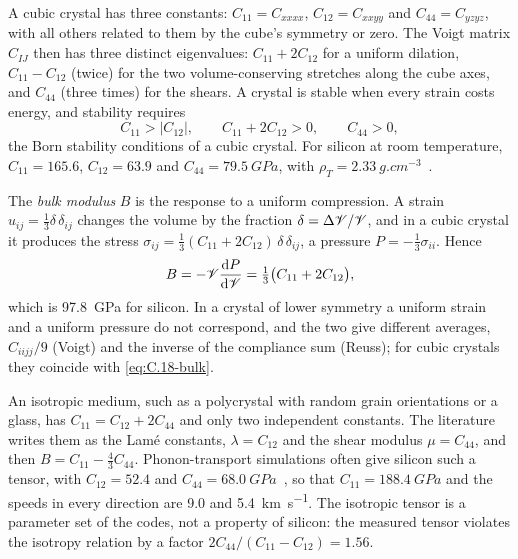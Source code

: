 A cubic crystal has three constants: $C_{11} = C_{xxxx}$, $C_{12} = C_{xxyy}$ and $C_{44} = C_{yzyz}$, with all others related to them by the cube's symmetry or zero. The Voigt matrix $C_{IJ}$ then has three distinct eigenvalues: $C_{11} + 2C_{12}$ for a uniform dilation, $C_{11} - C_{12}$ (twice) for the two volume-conserving stretches along the cube axes, and $C_{44}$ (three times) for the shears. A crystal is stable when every strain costs energy, and stability requires
\begin{equation}
  C_{11} > |C_{12}|, \qquad C_{11} + 2C_{12} > 0, \qquad C_{44} > 0 ,
  \label{eq:C.18-born}
\end{equation}
the Born stability conditions of a cubic crystal. For silicon at room temperature, $C_{11} = 165.6$, $C_{12} = 63.9$ and $C_{44} = \SI{79.5}{GPa}$, with $\rho_T = \SI{2.33}{g.cm^{-3}}$~\cite[Table~I]{martinez2019measurements}.

The \emph{bulk modulus} $B$ is the response to a uniform compression. A strain $u_{ij} = \tfrac13\delta\,\delta_{ij}$ changes the volume by the fraction $\delta = \Delta \mathscr{V}/\mathscr{V}$, and in a cubic crystal it produces the stress $\sigma_{ij} = \tfrac13(C_{11} + 2C_{12})\,\delta\,\delta_{ij}$, a pressure $P = -\tfrac13\sigma_{ii}$. Hence
\begin{equation}
  B = -\mathscr{V}\frac{\mathrm{d} P}{\mathrm{d} \mathscr{V}} = \tfrac13\bigl(C_{11} + 2C_{12}\bigr) ,
  \label{eq:C.18-bulk}
\end{equation}
which is \SI{97.8}{GPa} for silicon. In a crystal of lower symmetry a uniform strain and a uniform pressure do not correspond, and the two give different averages, $C_{iijj}/9$ (Voigt) and the inverse of the compliance sum (Reuss); for cubic crystals they coincide with \cref{eq:C.18-bulk}.

An isotropic medium, such as a polycrystal with random grain orientations or a glass, has $C_{11} = C_{12} + 2C_{44}$ and only two independent constants. The literature writes them as the Lamé constants, $\lambda = C_{12}$ and the shear modulus $\mu = C_{44}$, and then $B = C_{11} - \tfrac43C_{44}$. Phonon-transport simulations often give silicon such a tensor, with $C_{12} = 52.4$ and $C_{44} = \SI{68.0}{GPa}$~\cite[Table~I]{martinez2019measurements}, so that $C_{11} = \SI{188.4}{GPa}$ and the speeds in every direction are 9.0 and \SI{5.4}{km.s^{-1}}. The isotropic tensor is a parameter set of the codes, not a property of silicon: the measured tensor violates the isotropy relation by a factor $2C_{44}/(C_{11} - C_{12}) = 1.56$.


